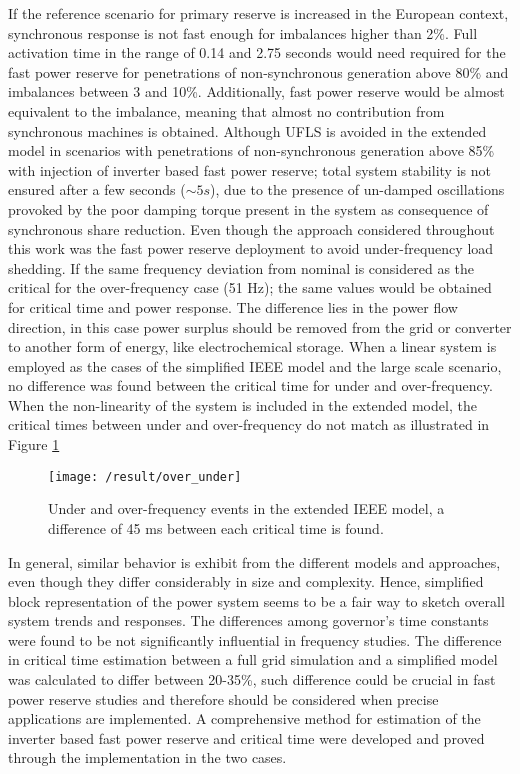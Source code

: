 If the reference scenario for primary reserve is increased in the European context, synchronous response is not fast enough for imbalances higher than 2\%. Full activation time in the range of 0.14 and 2.75 seconds would need required for the fast power reserve for penetrations of non-synchronous generation above 80\% and imbalances between 3 and 10\%. Additionally, fast power reserve would be almost equivalent to the imbalance, meaning that almost no contribution from synchronous machines is obtained. Although UFLS is avoided in the extended model in scenarios with penetrations of non-synchronous generation above 85\% with injection of inverter based fast power reserve; total system stability is not ensured after a few seconds ($ \sim5 s $), due to the presence of un-damped oscillations provoked by the poor damping torque present in the system as consequence of synchronous share reduction. Even though the approach considered throughout this work was the fast power reserve deployment to avoid under-frequency load shedding. If the same frequency deviation from nominal is considered as the critical for the over-frequency case (51 Hz); the same values would be obtained for critical time and power response. The difference lies in the power flow direction, in this case power surplus should be removed from the grid or converter to another form of energy, like electrochemical storage. When a linear system is employed as the cases of the simplified IEEE model and the large scale scenario, no difference was found between the critical time for under and over-frequency. When the non-linearity of the system is included in the extended model, the critical times between under and over-frequency do not match as illustrated in Figure \ref{fig:res_over_under}\\

\begin{figure}[h]
	\centering
	\texttt{[image: /result/over\_under]}
	\caption{Under and over-frequency events in the extended IEEE model, a difference of 45 ms between each critical time is found.}
	\label{fig:res_over_under}
\end{figure}

In general, similar behavior is exhibit from the different models and approaches, even though they differ considerably in size and complexity. Hence, simplified block representation of the power system seems to be a fair way to sketch overall system trends and responses. The differences among governor's time constants were found to be not significantly influential in frequency studies. The difference in critical time estimation between a full grid simulation and a simplified model was calculated to differ between 20-35\%, such difference could be crucial in fast power reserve studies and therefore should be considered when precise applications are implemented. A comprehensive method for estimation of the inverter based fast power reserve and critical time were developed and proved through the implementation in the two cases. 
